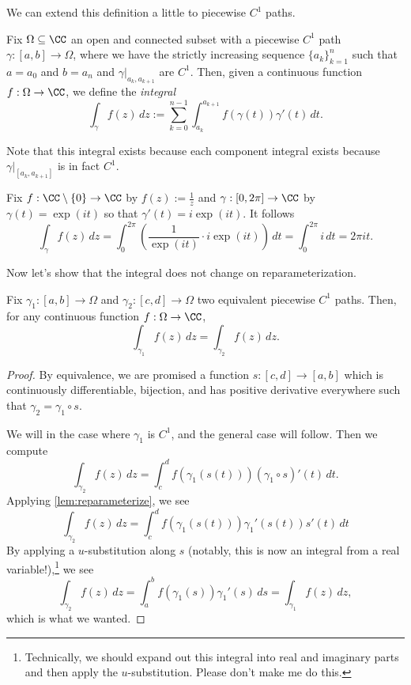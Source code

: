 We can extend this definition a little to piecewise $C^1$ paths.
\begin{definition}[Integration]
	Fix $\Omega\subseteq\CC$ an open and connected subset with a piecewise $C^1$ path $\gamma:[a,b]\to\Omega$, where we have the strictly increasing sequence $\{a_k\}_{k=1}^n$ such that $a=a_0$ and $b=a_n$ and $\gamma|_{a_k,a_{k+1}}$ are $C^1$. Then, given a continuous function $f:\Omega\to\CC$, we define the \textit{integral}
	\[\int_\gamma f(z)\,dz:=\sum_{k=0}^{n-1}\int_{a_k}^{a_{k+1}}f(\gamma(t))\gamma'(t)\,dt.\]
\end{definition}
Note that this integral exists because each component integral exists because $\gamma|_{[a_k,a_{k+1}]}$ is in fact $C^1$.
\begin{example}
	Fix $f:\CC\setminus\{0\}\to\CC$ by $f(z):=\frac1z$ and $\gamma:[0,2\pi]\to\CC$ by $\gamma(t)=\exp(it)$ so that $\gamma'(t)=i\exp(it)$. It follows
	\[\int_\gamma f(z)\,dz=\int_0^{2\pi}\left(\frac1{\exp(it)}\cdot i\exp(it)\right)\,dt=\int_0^{2\pi}i\,dt=2\pi it.\]
\end{example}
Now let's show that the integral does not change on reparameterization.
\begin{lemma}
	Fix $\gamma_1:[a,b]\to\Omega$ and $\gamma_2:[c,d]\to\Omega$ two equivalent piecewise $C^1$ paths. Then, for any continuous function $f:\Omega\to\CC$,
	\[\int_{\gamma_1}f(z)\,dz=\int_{\gamma_2}f(z)\,dz.\]
\end{lemma}
\begin{proof}
	By equivalence, we are promised a function $s:[c,d]\to[a,b]$ which is continuously differentiable, bijection, and has positive derivative everywhere such that $\gamma_2=\gamma_1\circ s$.

	We will in the case where $\gamma_1$ is $C^1$, and the general case will follow. Then we compute
	\[\int_{\gamma_2}f(z)\,dz=\int_c^df(\gamma_1(s(t)))(\gamma_1\circ s)'(t)\,dt.\]
	Applying \autoref{lem:reparameterize}, we see
	\[\int_{\gamma_2}f(z)\,dz=\int_c^df(\gamma_1(s(t)))\gamma_1'(s(t))s'(t)\,dt\]
	By applying a $u$-substitution along $s$ (notably, this is now an integral from a real variable!),\footnote{Technically, we should expand out this integral into real and imaginary parts and then apply the $u$-substitution. Please don't make me do this.} we see
	\[\int_{\gamma_2}f(z)\,dz=\int_a^bf(\gamma_1(s))\gamma_1'(s)\,ds=\int_{\gamma_1}f(z)\,dz,\]
	which is what we wanted.
\end{proof}

